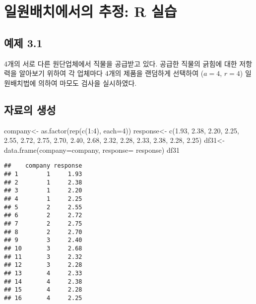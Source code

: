 \documentclass[
]{book}
\newenvironment{Shaded}{\begin{snugshade}}{\end{snugshade}}
\newcommand{\AttributeTok}[1]{\textcolor[rgb]{0.77,0.63,0.00}{#1}}
\newcommand{\DecValTok}[1]{\textcolor[rgb]{0.00,0.00,0.81}{#1}}
\newcommand{\FloatTok}[1]{\textcolor[rgb]{0.00,0.00,0.81}{#1}}
\newcommand{\FunctionTok}[1]{\textcolor[rgb]{0.00,0.00,0.00}{#1}}
\newcommand{\NormalTok}[1]{#1}
\newcommand{\OtherTok}[1]{\textcolor[rgb]{0.56,0.35,0.01}{#1}}
\newcommand{\SpecialCharTok}[1]{\textcolor[rgb]{0.00,0.00,0.00}{#1}}
\begin{document}
\hypertarget{rprogram}{%
\chapter{일원배치에서의 추정: R 실습}\label{rprogram}}

\hypertarget{uxc608uxc81c-3.1}{%
\section{예제 3.1}\label{uxc608uxc81c-3.1}}

4개의 서로 다른 원단업체에서 직물을 공급받고 있다. 공급한 직물의 긁힘에
대한 저항력을 알아보기 위하여 각 업체마다 4개의 제품을 랜덤하게 선택하여
(\(a=4\), \(r=4\)) 일원배치법에 의하여 마모도 검사을 실시하였다.

\hypertarget{uxc790uxb8ccuxc758-uxc0dduxc131}{%
\section{자료의 생성}\label{uxc790uxb8ccuxc758-uxc0dduxc131}}

\begin{Shaded}
\begin{Highlighting}[]
\NormalTok{company}\OtherTok{\textless{}{-}} \FunctionTok{as.factor}\NormalTok{(}\FunctionTok{rep}\NormalTok{(}\FunctionTok{c}\NormalTok{(}\DecValTok{1}\SpecialCharTok{:}\DecValTok{4}\NormalTok{), }\AttributeTok{each=}\DecValTok{4}\NormalTok{))}
\NormalTok{response}\OtherTok{\textless{}{-}} \FunctionTok{c}\NormalTok{(}\FloatTok{1.93}\NormalTok{, }\FloatTok{2.38}\NormalTok{, }\FloatTok{2.20}\NormalTok{, }\FloatTok{2.25}\NormalTok{,}
             \FloatTok{2.55}\NormalTok{, }\FloatTok{2.72}\NormalTok{, }\FloatTok{2.75}\NormalTok{, }\FloatTok{2.70}\NormalTok{,}
             \FloatTok{2.40}\NormalTok{, }\FloatTok{2.68}\NormalTok{, }\FloatTok{2.32}\NormalTok{, }\FloatTok{2.28}\NormalTok{,}
             \FloatTok{2.33}\NormalTok{, }\FloatTok{2.38}\NormalTok{, }\FloatTok{2.28}\NormalTok{, }\FloatTok{2.25}\NormalTok{)}
\NormalTok{df31}\OtherTok{\textless{}{-}} \FunctionTok{data.frame}\NormalTok{(}\AttributeTok{company=}\NormalTok{company, }\AttributeTok{response=}\NormalTok{ response)}
\NormalTok{df31}
\end{Highlighting}
\end{Shaded}

\begin{verbatim}
##    company response
## 1        1     1.93
## 2        1     2.38
## 3        1     2.20
## 4        1     2.25
## 5        2     2.55
## 6        2     2.72
## 7        2     2.75
## 8        2     2.70
## 9        3     2.40
## 10       3     2.68
## 11       3     2.32
## 12       3     2.28
## 13       4     2.33
## 14       4     2.38
## 15       4     2.28
## 16       4     2.25
\end{verbatim}
\end{document}
